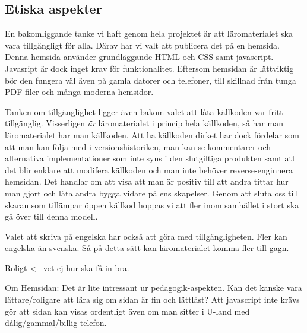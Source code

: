 \begin{binge}
\section{Etiska aspekter}

En bakomliggande tanke vi haft genom hela projektet är att läromaterialet ska vara tillgängligt för alla. Därav har vi valt att publicera det på en hemsida. Denna hemsida använder grundläggande HTML och CSS samt javascript. Javasript är dock inget krav för funktionalitet. Eftersom hemsidan är lättviktig bör den fungera väl även på gamla datorer och telefoner, till skillnad från tunga PDF-filer och många moderna hemsidor.

Tanken om tillgänglighet ligger även bakom valet att låta källkoden var fritt tillgänglig. Visserligen \textit{är} läromaterialet i princip hela källkoden, så har man läromaterialet har man källkoden. Att ha källkoden dirket har dock fördelar som att man kan följa med i versionshistoriken, man kan se kommentarer och alternativa implementationer som inte syns i den slutgiltiga produkten samt att det blir enklare att modifera källkoden och man inte behöver reverse-enginnera hemsidan. Det handlar om att visa att man är positiv till att andra tittar hur man gjort och låta andra bygga vidare på ens skapelser. Genom att sluta oss till skaran som tillämpar öppen källkod hoppas vi att fler inom samhället i stort ska gå över till denna modell.

Valet att skriva på engelska har också att göra med tillgängligheten. Fler kan engelska än svenska. Så på detta sätt kan läromaterialet komma fler till gagn.

Roligt <-- vet ej hur ska få in bra.



Om Hemsidan:
  Det är lite intressant ur pedagogik-aspekten. Kan det
  kanske vara lättare/roligare att lära sig om sidan är fin och
  lättläst? Att javascript inte krävs gör att sidan kan visas ordentligt
  även om man sitter i U-land med dålig/gammal/billig telefon.


\end{binge}
